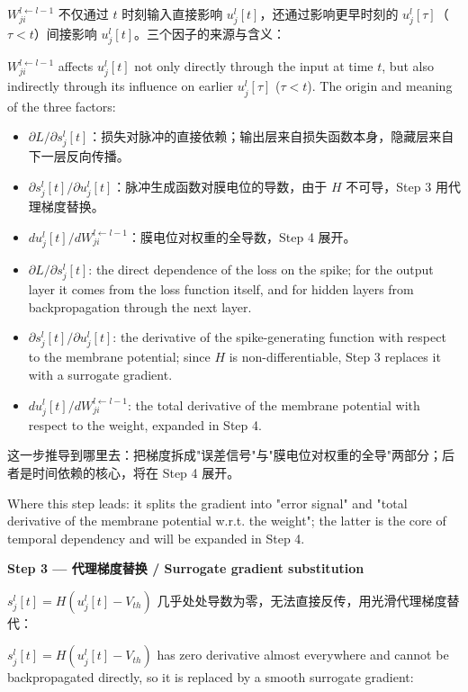 \documentclass[journal,12pt,onecolumn]{IEEEtran}
\begin{document}
$W_{ji}^{l\leftarrow l-1}$ 不仅通过 $t$ 时刻输入直接影响 $u_j^l[t]$，还通过影响更早时刻的 $u_j^l[\tau]$（$\tau<t$）间接影响 $u_j^l[t]$。三个因子的来源与含义：

$W_{ji}^{l\leftarrow l-1}$ affects $u_j^l[t]$ not only directly through the input at time $t$, but also indirectly through its influence on earlier $u_j^l[\tau]$ ($\tau<t$). The origin and meaning of the three factors:

\begin{itemize}[leftmargin=1.5em,itemsep=2pt]
\item $\partial L/\partial s_j^l[t]$：损失对脉冲的直接依赖；输出层来自损失函数本身，隐藏层来自下一层反向传播。
\item $\partial s_j^l[t]/\partial u_j^l[t]$：脉冲生成函数对膜电位的导数，由于 $H$ 不可导，Step 3 用代理梯度替换。
\item $du_j^l[t]/dW_{ji}^{l\leftarrow l-1}$：膜电位对权重的全导数，Step 4 展开。
\end{itemize}

\begin{itemize}[leftmargin=1.5em,itemsep=2pt]
\item $\partial L/\partial s_j^l[t]$: the direct dependence of the loss on the spike; for the output layer it comes from the loss function itself, and for hidden layers from backpropagation through the next layer.
\item $\partial s_j^l[t]/\partial u_j^l[t]$: the derivative of the spike-generating function with respect to the membrane potential; since $H$ is non-differentiable, Step 3 replaces it with a surrogate gradient.
\item $du_j^l[t]/dW_{ji}^{l\leftarrow l-1}$: the total derivative of the membrane potential with respect to the weight, expanded in Step 4.
\end{itemize}

这一步推导到哪里去：把梯度拆成"误差信号"与"膜电位对权重的全导"两部分；后者是时间依赖的核心，将在 Step 4 展开。

Where this step leads: it splits the gradient into "error signal" and "total derivative of the membrane potential w.r.t. the weight"; the latter is the core of temporal dependency and will be expanded in Step 4.

\medskip\noindent\textbf{Step 3 — 代理梯度替换 / Surrogate gradient substitution}

$s_j^l[t]=H(u_j^l[t]-V_{th})$ 几乎处处导数为零，无法直接反传，用光滑代理梯度替代：

$s_j^l[t]=H(u_j^l[t]-V_{th})$ has zero derivative almost everywhere and cannot be backpropagated directly, so it is replaced by a smooth surrogate gradient:
\end{document}
